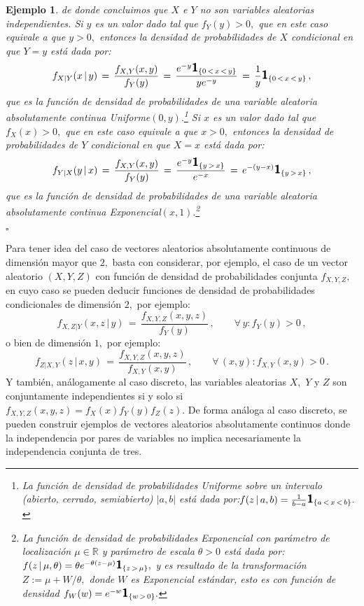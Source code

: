\documentclass[spanish,10pt,letterpaper]{article}
\newtheorem{ejem}{Ejemplo}
\newcommand{\Runo}{\mathbb{R}}
\newcommand{\indic}{\textbf{\textsf{\large{1}}}}
\newcommand{\qed}{\begin{flushright}$\square$\end{flushright}}
\begin{document}
\begin{ejem}
   de donde concluimos que $X$ e $Y$ no son variables aleatorias independientes. Si $y$ es un valor dado tal que $f_Y(y)>0,$ que en este caso equivale a que $y>0,$ entonces la densidad de probabilidades de $X$ condicional en que $Y=y$ está dada por:
   $$f_{X|Y}(x\,|\,y) \,=\, \frac{f_{X,Y}(x,y)}{f_Y(y)} \,=\, \frac{e^{-y}\indic_{\{0\,<\,x\,<\,y\}}}{ye^{-y}} \,=\, \frac{1}{y}\indic_{\{0\,<\,x\,<\,y\}}\,,$$
   que es la función de densidad de probabilidades de una variable aleatoria absolutamente continua Uniforme$(0,y).$\footnote{La función de densidad de probabilidades Uniforme sobre un intervalo (abierto, cerrado, semiabierto) $|a,b|$ está dada por:\linebreak $f(z\,|\,a,b)=\frac{1}{b-a}\indic_{\{a\,<\,x\,<\,b\}}.$}
   Si $x$ es un valor dado tal que $f_X(x)>0,$ que en este caso equivale a que $x>0,$ entonces la densidad de probabilidades de $Y$ condicional en que $X=x$ está dada por:
   $$f_{Y|X}(y\,|\,x) \,=\, \frac{f_{X,Y}(x,y)}{f_Y(y)} \,=\, \frac{e^{-y}\indic_{\{y\,>\,x\}}}{e^{-x}} \,=\, e^{-(y-x)}\indic_{\{y\,>\,x\}}\,,$$
   que es la función de densidad de probabilidades de una variable aleatoria absolutamente continua Exponencial$(x,1).$\footnote{La función de densidad de probabilidades Exponencial con parámetro de localización $\mu\in\Runo$ y parámetro de escala $\theta>0$ está dada por: $f(z\,|\,\mu,\theta)=\theta e^{-\theta(z-\mu)}\indic_{\{z\,>\,\mu\}},$ y es resultado de la transformación $Z:=\mu+W/\theta,$ donde $W$ es Exponencial estándar, esto es con función de densidad $f_W(w)=e^{-w}\indic_{\{w\,>\,0\}}.$} \qed 
\end{ejem}

Para tener idea del caso de vectores aleatorios absolutamente continuous de dimensión mayor que $2,$ basta con considerar, por ejemplo, el caso de un vector aleatorio $(X,Y,Z)$ con función de densidad de probabilidades conjunta $f_{X,Y,Z},$ en cuyo caso se pueden deducir funciones de densidad de probabilidades condicionales de dimensión $2,$ por ejemplo:
$$f_{X,Z|Y}(x,z\,|\,y) \,=\, \frac{f_{X,Y,Z}(x,y,z)}{f_Y(y)}\,,\qquad \forall\,y: f_Y(y)>0\,,$$
o bien de dimensión $1,$ por ejemplo:
$$f_{Z|X,Y}(z\,|\,x,y) \,=\, \frac{f_{X,Y,Z}(x,y,z)}{f_{X,Y}(x,y)}\,,\qquad \forall\,(x,y): f_{X,Y}(x,y)>0\,.$$ Y también, análogamente al caso discreto, las variables aleatorias $X,$ $Y$ y $Z$ son conjuntamente independientes si y solo si $f_{X,Y,Z}(x,y,z)=f_X(x)f_Y(y)f_Z(z).$ De forma análoga al caso discreto, se pueden construir ejemplos de vectores aleatorios absolutamente continuos donde la independencia por pares de variables no implica necesariamente la independencia conjunta de tres.
\end{document}
